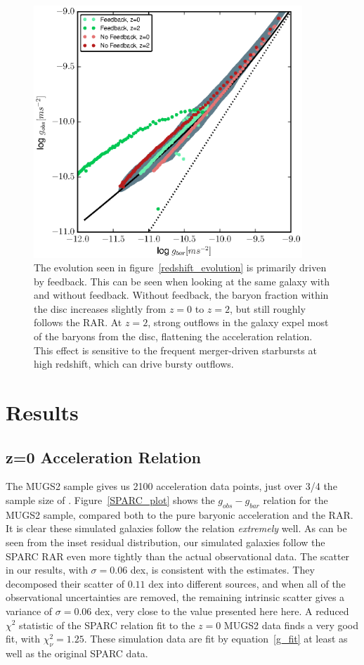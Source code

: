 \begin{figure}
    \includegraphics[width=0.9\textwidth]{figures4/FB_effects.eps}
    \caption{The evolution seen in figure~\ref{redshift_evolution} is primarily
    driven by feedback.  This can be seen when looking at the same galaxy with
    and without feedback.  Without feedback, the baryon fraction within the disc
    increases slightly from $z=0$ to $z=2$, but still roughly follows the 
    RAR.  At $z=2$, strong outflows in the galaxy expel most of the baryons
    from the disc, flattening the acceleration relation.  This effect is
    sensitive to the frequent merger-driven starbursts at high redshift, which
    can drive bursty outflows.}
    \label{FB_effects}
\end{figure}
\section{Results}
\subsection{z=0 Acceleration Relation}
The MUGS2 sample gives us 2100 acceleration data points, just over 3/4 the
sample size of \citet{McGaugh2016}. Figure~\ref{SPARC_plot} shows the
$g_{obs}-g_{bar}$ relation for the MUGS2 sample, compared both to the pure
baryonic acceleration and the RAR.  It is clear these
simulated galaxies follow the \citet{McGaugh2016} relation {\it extremely} well.
As can be seen from the inset residual distribution, our simulated galaxies
follow the SPARC RAR even more tightly than the actual observational data.
The scatter in our results, with $\sigma=0.06$ dex, is consistent with the
\citet{McGaugh2016} estimates.  They decomposed their scatter of $0.11$
dex into different sources, and when all of the observational uncertainties are
removed, the remaining intrinsic scatter gives a variance of $\sigma=0.06$ dex,
very close to the value presented here here.  A reduced $\chi^2$ statistic of the SPARC
relation fit to the $z=0$ MUGS2 data finds a very good fit, with $\chi^2_\nu =
1.25$.  These simulation data are fit by equation~\ref{g_fit} at least as well
as the original SPARC data.

